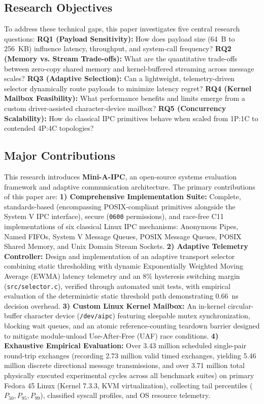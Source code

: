 \subsection{Research Objectives}
To address these technical gaps, this paper investigates five central research questions:
\textbf{RQ1 (Payload Sensitivity):} How does payload size (64~B to 256~KB) influence latency, throughput, and system-call frequency?
\textbf{RQ2 (Memory vs. Stream Trade-offs):} What are the quantitative trade-offs between zero-copy shared memory and kernel-buffered streaming across message scales?
\textbf{RQ3 (Adaptive Selection):} Can a lightweight, telemetry-driven selector dynamically route payloads to minimize latency regret?
\textbf{RQ4 (Kernel Mailbox Feasibility):} What performance benefits and limits emerge from a custom driver-assisted character-device mailbox?
\textbf{RQ5 (Concurrency Scalability):} How do classical IPC primitives behave when scaled from 1P:1C to contended 4P:4C topologies?

\subsection{Major Contributions}
This research introduces \textbf{Mini-A-IPC}, an open-source systems evaluation framework and adaptive communication architecture. The primary contributions of this paper are:
\textbf{1) Comprehensive Implementation Suite:} Complete, standards-based (encompassing POSIX-compliant primitives alongside the System V IPC interface), secure (\texttt{0600} permissions), and race-free C11 implementations of six classical Linux IPC mechanisms: Anonymous Pipes, Named FIFOs, System V Message Queues, POSIX Message Queues, POSIX Shared Memory, and Unix Domain Stream Sockets.
\textbf{2) Adaptive Telemetry Controller:} Design and implementation of an adaptive transport selector combining static thresholding with dynamic Exponentially Weighted Moving Average (EWMA) latency telemetry and an 8\% hysteresis switching margin (\texttt{src/selector.c}), verified through automated unit tests, with empirical evaluation of the deterministic static threshold path demonstrating 0.66~ns decision overhead.
\textbf{3) Custom Linux Kernel Mailbox:} An in-kernel circular-buffer character device (\texttt{/dev/aipc}) featuring sleepable mutex synchronization, blocking wait queues, and an atomic reference-counting teardown barrier designed to mitigate module-unload Use-After-Free (UAF) race conditions.
\textbf{4) Exhaustive Empirical Evaluation:} Over 3.43 million scheduled single-pair round-trip exchanges (recording 2.73 million valid timed exchanges, yielding 5.46 million discrete directional message transmissions, and over 3.71 million total physically executed experimental cycles across all benchmark suites) on primary Fedora 45 Linux (Kernel 7.3.3, KVM virtualization), collecting tail percentiles ($P_{50}, P_{95}, P_{99}$), classified syscall profiles, and OS resource telemetry.

